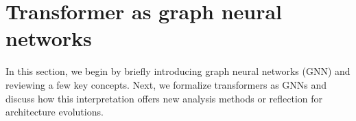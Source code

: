 








\section{Transformer as graph neural networks}

In this section, we begin by briefly introducing graph neural networks (GNN) and reviewing a few key concepts. Next, we formalize transformers as GNNs and discuss how this interpretation offers new analysis methods or reflection for architecture evolutions.

